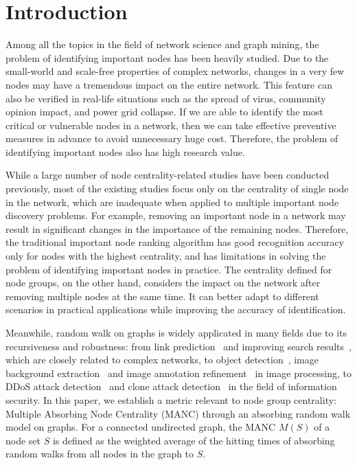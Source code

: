 \documentclass[sigconf]{acmart}
\begin{document}
\section{Introduction}

Among all the topics in the field of network science and graph mining, the problem of identifying important nodes has been heavily studied.
Due to the small-world and scale-free properties of complex networks, changes in a very few nodes may have a tremendous impact on the entire network.
This feature can also be verified in real-life situations such as the spread of virus, community opinion impact, and power grid collapse.
If we are able to identify the most critical or vulnerable nodes in a network, then we can take effective preventive measures in advance to avoid unnecessary huge cost.
Therefore, the problem of identifying important nodes also has high research value.

While a large number of node centrality-related studies have been conducted previously, most of the existing studies focus only on the centrality of single node in the network, which are inadequate when applied to multiple important node discovery problems.
For example, removing an important node in a network may result in significant changes in the importance of the remaining nodes.
Therefore, the traditional important node ranking algorithm has good recognition accuracy only for nodes with the highest centrality, and has limitations in solving the problem of identifying important nodes in practice.
The centrality defined for node groups, on the other hand, considers the impact on the network after removing multiple nodes at the same time.
It can better adapt to different scenarios in practical applications while improving the accuracy of identification.

Meanwhile, random walk on graphs is widely applicated in many fields due to its recursiveness and robustness: from link prediction~\cite{YiGuWeTiHa10} and improving search results~\cite{LiPeMaQiWeQi10}, which are closely related to complex networks, to object detection~\cite{GoViHuRa10}, image background extraction~\cite{HuWaYeChLa16} and image annotation refinement~\cite{WaJiZhZh10} in image processing, to DDoS attack detection~\cite{XuZhXiYu14} and clone attack detection~\cite{ZeCaZhGuXi10} in the field of information security.
In this paper, we establish a metric relevant to node group centrality: Multiple Absorbing Node Centrality (MANC) through an absorbing random walk model on graphs.
For a connected undirected graph, the MANC \(M(S)\) of a node set \(S\) is defined as the weighted average of the hitting times of absorbing random walks from all nodes in the graph to \(S\).
\end{document}
